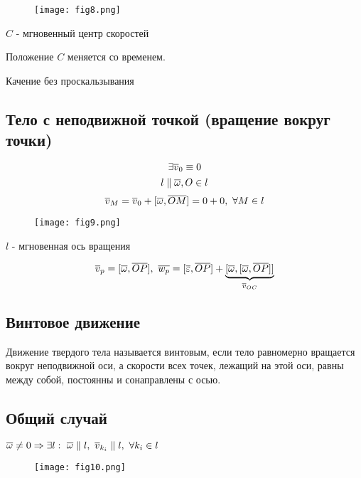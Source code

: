   \begin{figure}[H]
  \centering
  \texttt{[image: fig8.png]} 
  \end{figure}  

  \begin{df}
  $C$ - мгновенный центр скоростей
  \end{df}
  \begin{ntc}
  Положение $C$ меняется со временем.
  \end{ntc}
  \begin{xmp}
  Качение без проскальзывания
  \end{xmp}

  \subsection{Тело с неподвижной точкой (вращение вокруг точки)}
  $$ \exists {\overline{v}}_0 \equiv 0 $$
  $$ l \parallel {\overline{\omega}}, O \in l $$
  $$ {\overline{v}}_M = {\overline{v}}_0 + [{\overline{\omega}}, {\overline{OM}}] = 0 + 0,~ \forall M \in l $$
  \begin{figure}[H]
  \centering
  \texttt{[image: fig9.png]} 
  \end{figure}  

  \begin{df} 
  $l$ - мгновенная ось вращения 
  \end{df}
  $$ {\overline{v}}_p = [{\overline{\omega}}, {\overline{OP}}],~ {\overline{w_p}} = [{\overline{\varepsilon}}, {\overline{OP}}] + \underbrace{[{\overline{\omega}}, [ {\overline{\omega}}, \overline{OP}]]}_{{\overline{v}}_{OC}} $$
  \subsection{Винтовое движение}
  \begin{df} 
  Движение твердого тела называется винтовым, если тело равномерно вращается вокруг неподвижной оси, а скорости всех точек, лежащий на этой оси, равны между собой, постоянны и сонаправлены с осью.
  \end{df}
  \subsection{Общий случай}
  \begin{teo}
  $ {\overline{\omega}} \neq 0 \Rightarrow \exists l:~ {\overline{\omega}} \parallel l,~ {\overline{v}}_{k_i} \parallel l,~ \forall k_i \in l$
  \end{teo}
  \begin{figure}[H]
  \centering
  \texttt{[image: fig10.png]} 
  \end{figure}  

